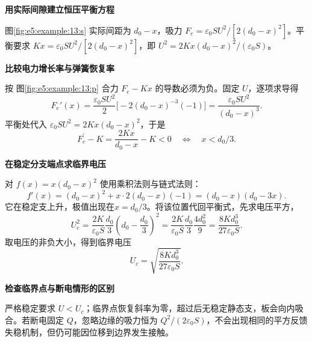\begin{solution}\textbf{用实际间隙建立恒压平衡方程}\par\nobreak
图\ref{fig:e5:example:13:s} 实际间距为 $d_0-x$，吸力 $F_e=\varepsilon_0SU^2/[2(d_0-x)^2]$。平衡要求
$Kx=\varepsilon_0SU^2/[2(d_0-x)^2]$，即 $U^2=2Kx(d_0-x)^2/(\varepsilon_0S)$。



\par\medskip{}\noindent\textbf{比较电力增长率与弹簧恢复率}\par\nobreak
按 图\ref{fig:e5:example:13:p} 合力 $F_e-Kx$ 的导数必须为负。固定 $U$，逐项求导得
\[
F_e'(x)=\frac{\varepsilon_0SU^2}{2}
\bigl[-2(d_0-x)^{-3}(-1)\bigr]
=\frac{\varepsilon_0SU^2}{(d_0-x)^3}.
\]
平衡处代入 $\varepsilon_0SU^2=2Kx(d_0-x)^2$，于是
\[
F_e^\prime-K=\frac{2Kx}{d_0-x}-K<0
 \quad\Longleftrightarrow\quad x<d_0/3.
\]


\par\medskip{}\noindent\textbf{在稳定分支端点求临界电压}\par\nobreak
对 $f(x)=x(d_0-x)^2$ 使用乘积法则与链式法则：
\[
f'(x)=(d_0-x)^2+x\cdot2(d_0-x)(-1)
=(d_0-x)(d_0-3x).
\]
它在稳定支上升，极值出现在$x=d_0/3$。将该位置代回平衡式，先求电压平方，
\[
U_c^2=\frac{2K}{\varepsilon_0S}\frac{d_0}{3}
\left(d_0-\frac{d_0}{3}\right)^2
=\frac{2K}{\varepsilon_0S}\frac{d_0}{3}\frac{4d_0^2}{9}
=\frac{8Kd_0^3}{27\varepsilon_0S}.
\]
取电压的非负大小，得到临界电压
\[
 U_c=\sqrt{\frac{8Kd_0^3}{27\varepsilon_0S}}.
\]


\par\medskip{}\noindent\textbf{检查临界点与断电情形的区别}\par\nobreak
严格稳定要求 $U<U_c$；临界点恢复斜率为零，超过后无稳定静态支，板会向内吸合。若断电固定 $Q$，忽略边缘的吸力恒为 $Q^2/(2\varepsilon_0S)$，不会出现相同的平方反馈失稳机制，但仍可能因位移到边界发生接触。\end{solution}
